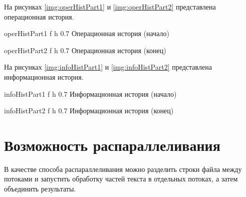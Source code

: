 \clearpage

На рисунках \ref{img:operHistPart1} и \ref{img:operHistPart2} представлена операционная история.

{operHistPart1} %
{f} %
{h} %
{0.7\textwidth} %
{Операционная история (начало)} %

{operHistPart2} %
{f} %
{h} %
{0.7\textwidth} %
{Операционная история (конец)} %

\clearpage

На рисунках \ref{img:infoHistPart1} и \ref{img:infoHistPart2} представлена информационная история.

{infoHistPart1} %
{f} %
{h} %
{0.7\textwidth} %
{Информационная история (начало)} %

{infoHistPart2} %
{f} %
{h} %
{0.7\textwidth} %
{Информационная история (конец)} %

\clearpage

\section{Возможность распараллеливания}

В качестве способа распараллеливания можно разделить строки файла между потоками и запустить обработку частей текста в отдельных потоках, а затем объединить результаты.
